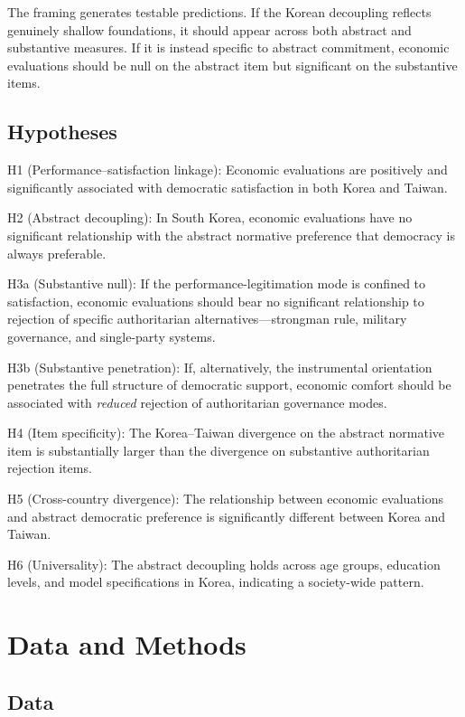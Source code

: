 \documentclass[
  12pt,
  12pt,
  letterpaper]{article}
\begin{document}
The framing generates testable predictions. If the Korean decoupling
reflects genuinely shallow foundations, it should appear across both
abstract and substantive measures. If it is instead specific to abstract
commitment, economic evaluations should be null on the abstract item but
significant on the substantive items.

\subsection{Hypotheses}\label{hypotheses}

H1 (Performance--satisfaction linkage): Economic evaluations are
positively and significantly associated with democratic satisfaction in
both Korea and Taiwan.

H2 (Abstract decoupling): In South Korea, economic evaluations have no
significant relationship with the abstract normative preference that
democracy is always preferable.

H3a (Substantive null): If the performance-legitimation mode is confined
to satisfaction, economic evaluations should bear no significant
relationship to rejection of specific authoritarian
alternatives---strongman rule, military governance, and single-party
systems.

H3b (Substantive penetration): If, alternatively, the instrumental
orientation penetrates the full structure of democratic support,
economic comfort should be associated with \emph{reduced} rejection of
authoritarian governance modes.

H4 (Item specificity): The Korea--Taiwan divergence on the abstract
normative item is substantially larger than the divergence on
substantive authoritarian rejection items.

H5 (Cross-country divergence): The relationship between economic
evaluations and abstract democratic preference is significantly
different between Korea and Taiwan.

H6 (Universality): The abstract decoupling holds across age groups,
education levels, and model specifications in Korea, indicating a
society-wide pattern.

\section{Data and Methods}\label{data-and-methods}

\subsection{Data}\label{data}
\end{document}
